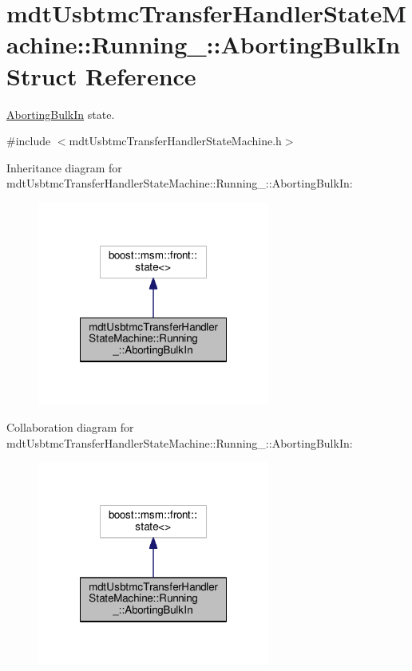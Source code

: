 \hypertarget{structmdt_usbtmc_transfer_handler_state_machine_1_1_running___1_1_aborting_bulk_in}{\section{mdt\-Usbtmc\-Transfer\-Handler\-State\-Machine\-:\-:Running\-\_\-\-:\-:Aborting\-Bulk\-In Struct Reference}
\label{structmdt_usbtmc_transfer_handler_state_machine_1_1_running___1_1_aborting_bulk_in}
}


\hyperlink{structmdt_usbtmc_transfer_handler_state_machine_1_1_running___1_1_aborting_bulk_in}{Aborting\-Bulk\-In} state.  




{\ttfamily \#include $<$mdt\-Usbtmc\-Transfer\-Handler\-State\-Machine.\-h$>$}



Inheritance diagram for mdt\-Usbtmc\-Transfer\-Handler\-State\-Machine\-:\-:Running\-\_\-\-:\-:Aborting\-Bulk\-In\-:
\nopagebreak
\begin{figure}[H]
\begin{center}
\leavevmode
\includegraphics[width=216pt]{structmdt_usbtmc_transfer_handler_state_machine_1_1_running___1_1_aborting_bulk_in__inherit__graph}
\end{center}
\end{figure}


Collaboration diagram for mdt\-Usbtmc\-Transfer\-Handler\-State\-Machine\-:\-:Running\-\_\-\-:\-:Aborting\-Bulk\-In\-:
\nopagebreak
\begin{figure}[H]
\begin{center}
\leavevmode
\includegraphics[width=216pt]{structmdt_usbtmc_transfer_handler_state_machine_1_1_running___1_1_aborting_bulk_in__coll__graph}
\end{center}
\end{figure}
